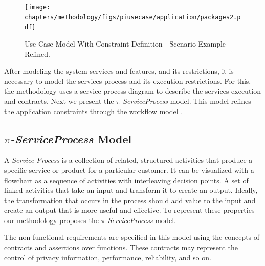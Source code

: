 \begin{figure}[ht!]
\centering
\texttt{[image: chapters/methodology/figs/piusecase/application/packages2.pdf]}
\caption{Use Case Model With Constraint Definition - Scenario Example Refined.}
\label{fig:usecaseContraint}
\end{figure}


\bigskip
\bigskip

After modeling the system services and features, and its
restrictions, it is necessary to model the services process and its
execution restrictions. For this, the methodology uses a service process diagram
to describe the services execution and contracts. Next we present the
\textit{$\pi$-ServiceProcess} model. This model refines the application
constraints through the workflow model .

\subsection{\textit{$\pi$-ServiceProcess} Model}


A \textit{Service Process} is a collection of related, structured activities that produce a specific service or product for
a particular customer. It can be visualized with a flowchart
as a sequence of activities with interleaving decision points.  A set of
linked activities that take an input and transform it to create an output.
Ideally, the transformation that occurs in the process should add value to the
input and create an output that is more useful and effective. To represent these
properties our methodology proposes the \textit{$\pi$-ServiceProcess} model.

The non-functional requirements are specified in this model using the concepts
of contracts and assertions over functions. These contracts may represent the
control of privacy information, performance, reliability, and so on.

